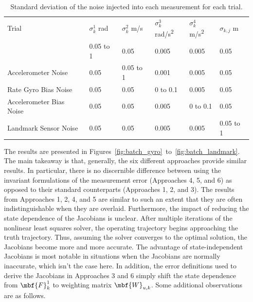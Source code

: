 \begin{table}[]
\centering
\begin{tabular}{|l|l|l|l|l|l|}
\hline
Trial                                            & $\sigma_k^1$ \si{\radian}          & $\sigma_k^2$ \si{m/s} & $\sigma_k^3$ \si{rad/s^2} & $\sigma_k^4$ \si{m/s^2} & $\sigma_{k,j}$ \si{m}      \\ \hhline{|=|=|=|=|=|=|}
\multicolumn{1}{|l|}{Rate Gyro Noise}            & \multicolumn{1}{l|}{0.05 to 1} & \multicolumn{1}{l|}{0.05}     & \multicolumn{1}{l|}{0.005} & \multicolumn{1}{l|}{0.005} & \multicolumn{1}{l|}{0.05}     \\ \hline
\multicolumn{1}{|l|}{Accelerometer Noise}  & \multicolumn{1}{l|}{0.05} & \multicolumn{1}{l|}{0.05 to 1}     & \multicolumn{1}{l|}{0.001} & \multicolumn{1}{l|}{0.005} & \multicolumn{1}{l|}{0.05}     \\ \hline
\multicolumn{1}{|l|}{Rate Gyro Bias Noise}  & \multicolumn{1}{l|}{0.05} & \multicolumn{1}{l|}{0.05}     & \multicolumn{1}{l|}{0 to 0.1} & \multicolumn{1}{l|}{0.005} & \multicolumn{1}{l|}{0.05}     \\ \hline
\multicolumn{1}{|l|}{Accelerometer Bias Noise} & \multicolumn{1}{l|}{0.05} & \multicolumn{1}{l|}{0.05}     & \multicolumn{1}{l|}{0.005} & \multicolumn{1}{l|}{0 to 0.1} & \multicolumn{1}{l|}{0.05}     \\ \hline
\multicolumn{1}{|l|}{Landmark Sensor Noise} & \multicolumn{1}{l|}{0.05} & \multicolumn{1}{l|}{0.05}     & \multicolumn{1}{l|}{0.005} & \multicolumn{1}{l|}{0.005} & \multicolumn{1}{l|}{0.05 to 1}     \\ \hline
\end{tabular}
\caption{Standard deviation of the noise injected into each measurement for each trial.}
\label{tab:se3_batch}
\end{table}

The results are presented in Figures~\ref{fig:batch_gyro}~to~\ref{fig:batch_landmark}. The main takeaway is that, generally, the six different approaches provide similar results. In particular, there is no discernible difference between using the invariant formulations of the measurement error (Approaches 4, 5, and 6) as opposed to their standard counterparts (Approaches 1, 2, and 3). The results from Approaches 1, 2, 4, and 5 are similar to such an extent that they are often indistinguishable when they are overlaid. Furthermore, the impact of reducing the state dependence of the Jacobians is unclear. After multiple iterations of the nonlinear least squares solver, the operating trajectory begins approaching the truth trajectory. Thus, assuming the solver converges to the optimal solution, the Jacobians become more and more accurate. The advantage of state-independent Jacobians is most notable in situations when the Jacobians are normally inaccurate, which isn't the case here. In addition, the error definitions used to derive the Jacobians in Approaches 3 and 6 simply shift the state dependence from $\mbf{F}_k^1$ to weighting matrix $\mbf{W}_{u,k}$. Some additional observations are as follows.

